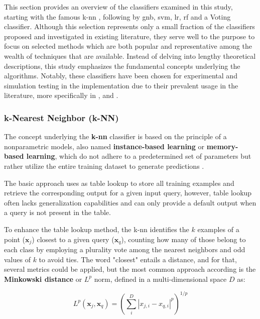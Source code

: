 This section provides an overview of the classifiers examined in this study, starting with the famous \gls{k-nn} , following by \gls{gnb}, \gls{svm}, \gls{lr}, \gls{rf} and a Voting classifier.  Although this selection represents only a small fraction of the classifiers proposed and investigated in existing literature, they serve well to the purpose to focus on selected methods which are both popular and representative among the wealth of techniques that are available. Instead of delving into lengthy theoretical descriptions, this study emphasizes the fundamental concepts underlying the algorithms. Notably, these classifiers have been chosen for experimental and simulation testing in the implementation due to their prevalent usage in the literature, more specifically in \textcite{Bountourakis2015}, \textcite{Silva2019} and \textcite{Lhoest2021}.


\subsubsection{k-Nearest Neighbor (k-NN)}
\label{subsubsec:machine_learning_k-NN}

The concept underlying the \textbf{\gls{k-nn}} classifier is based on the principle of a nonparametric models, also named \textbf{instance-based learning} or \textbf{memory-based learning}, which do not adhere to a predetermined set of parameters but rather utilize the entire training dataset to generate predictions \cite{Russel2010}. 

The basic approach uses as table lookup to store all training examples and retrieve the corresponding output for a given input query, however, table lookup often lacks generalization capabilities and can only provide a default output when a query is not present in the table.

To enhance the table lookup method, the \gls{k-nn} identifies the $k$ examples of a point ($\mathbf{x}_j$) closest to a given query ($\mathbf{x}_q$), counting how many of those belong to each class by employing a plurality vote among the nearest neighbors and odd values of $k$ to avoid ties. The word "closest" entails a distance, and for that, several metrics could be applied, but the most common approach according \textcite{Russel2010} is the \textbf{Minkowski distance} or $L^p$ norm, defined in a multi-dimensional space $D$ as:

\begin{equation}
    \label{eq:minkowski_distance}
L^p\left(\mathbf{x}_j, \mathbf{x}_q\right)=\left(\sum_i^D\left|x_{j, i}-x_{q, i}\right|^p\right)^{1 / p}
\end{equation}

